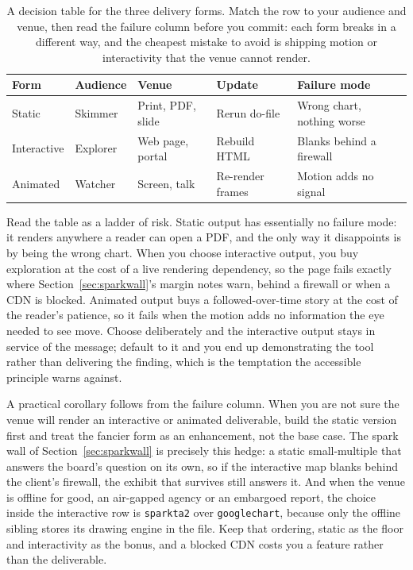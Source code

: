 \begin{table}[htbp]
\centering
\caption[Choosing static, interactive, or animated]{A decision table for the three delivery forms. Match the row to your audience and venue, then read the failure column before you commit: each form breaks in a different way, and the cheapest mistake to avoid is shipping motion or interactivity that the venue cannot render.}
\label{tab:interactive-choice}
{\footnotesize
\begin{tabular}{@{}llllp{6.0cm}@{}}
\hline
Form & Audience & Venue & Update & Failure mode \\
\hline
Static & Skimmer & Print, PDF, slide & Rerun do-file & Wrong chart, nothing worse \\
Interactive & Explorer & Web page, portal & Rebuild HTML & Blanks behind a firewall \\
Animated & Watcher & Screen, talk & Re-render frames & Motion adds no signal \\
\hline
\end{tabular}
}
\end{table}

Read the table as a ladder of risk. Static output has essentially no failure mode: it renders anywhere a reader can open a PDF, and the only way it disappoints is by being the wrong chart. When you choose interactive output, you buy exploration at the cost of a live rendering dependency, so the page fails exactly where Section~\ref{sec:sparkwall}'s margin notes warn, behind a firewall or when a CDN is blocked. Animated output buys a followed-over-time story at the cost of the reader's patience, so it fails when the motion adds no information the eye needed to see move. Choose deliberately and the interactive output stays in service of the message; default to it and you end up demonstrating the tool rather than delivering the finding, which is the temptation the accessible principle warns against.

A practical corollary follows from the failure column. When you are not sure the venue will render an interactive or animated deliverable, build the static version first and treat the fancier form as an enhancement, not the base case. The spark wall of Section~\ref{sec:sparkwall} is precisely this hedge: a static small-multiple that answers the board's question on its own, so if the interactive map blanks behind the client's firewall, the exhibit that survives still answers it. And when the venue is offline for good, an air-gapped agency or an embargoed report, the choice inside the interactive row is \texttt{sparkta2} over \texttt{googlechart}, because only the offline sibling stores its drawing engine in the file. Keep that ordering, static as the floor and interactivity as the bonus, and a blocked CDN costs you a feature rather than the deliverable.

